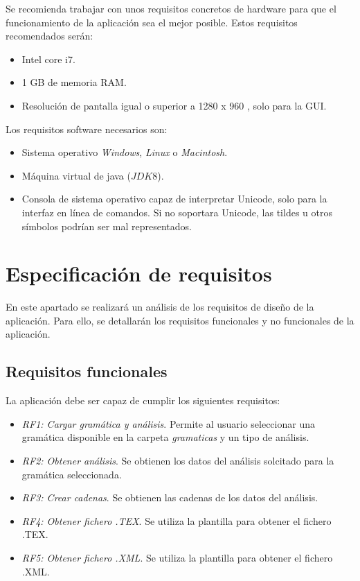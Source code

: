 Se recomienda trabajar con unos requisitos concretos de hardware para que el funcionamiento de la aplicación sea el mejor posible. Estos requisitos recomendados serán:
\begin{itemize}
\item Intel core i7.
\item 1 GB de memoria RAM.
\item Resolución de pantalla igual o superior a 1280 x 960 , solo para la GUI.
\end{itemize}

Los requisitos software necesarios son:
\begin{itemize}
\item Sistema operativo \textit{Windows}, \textit{Linux} o \textit{Macintosh}.
\item Máquina virtual de java ($JDK 8$).
\item Consola de sistema operativo capaz de interpretar Unicode, solo para la interfaz en línea de comandos. Si no soportara Unicode, las tildes u otros símbolos podrían ser mal representados.
\end{itemize}

\section{Especificación de requisitos}
En este apartado se realizará un análisis de los requisitos de diseño de la aplicación. Para ello, se detallarán los requisitos funcionales y no funcionales de la aplicación.

\subsection{Requisitos funcionales}
La aplicación debe ser capaz de cumplir los siguientes requisitos:

\begin{itemize}
\item \textit{RF1: Cargar gramática y análisis}. Permite al usuario seleccionar una gramática disponible en la carpeta \textit{gramaticas} y un tipo de análisis.
\item \textit{RF2: Obtener análisis}. Se obtienen los datos del análisis solcitado para la gramática seleccionada.
\item \textit{RF3: Crear cadenas}. Se obtienen las cadenas de los datos del análisis.
\item \textit{RF4: Obtener fichero .TEX}. Se utiliza la plantilla para obtener el fichero .TEX.
\item \textit{RF5: Obtener fichero .XML}. Se utiliza la plantilla para obtener el fichero .XML.
\end{itemize}

